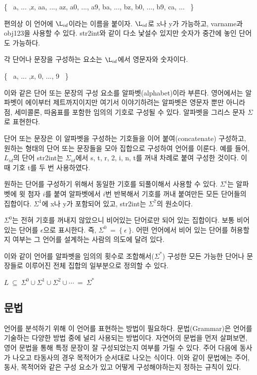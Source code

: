 \documentclass[a4paper]{book}
\begin{document}
\begin{center}
  \{ \ a, ... ,z, aa, ..., az, a0, ..., a9,
       ba, ..., bz, b0, ..., b9, ca, ...
     \ 
  \}
\end{center}

편의상 이 언어에 $\L_{id}$이라는 이름을 붙이자. $\L_{id}$로 x나 y가
가능하고, varname과 obj123을 사용할 수 있다. str2int와 같이 다소
낯설수 있지만 숫자가 중간에 놓인 단어도 가능하다.

각 단어나 문장을 구성하는 요소는 $\L_{id}$에서 영문자와 숫자이다.
\begin{center}
  \{ \ a, ... ,z, 0, ..., 9
     \ 
  \}
\end{center}


이와 같은 단어 또는 문장의 구성 요소를 알파벳(alphabet)이라
부른다. 영어에서는 알파벳이 에이부터 제트까지이지만 여기서
이야기하려는 알파벳은 영문자 뿐만 아니라 점, 세미콜론, 따옴표를 포함한
임의의 기호로 구성될 수 있다. 알파벳을 그리스 문자 $\Sigma$로
표현한다.

단어 또는 문장은 이 알파벳을 구성하는 기호들을 이어 붙여(concatenate)
구성하고, 원하는 형태의 단어 또는 문장들을 모아 집합으로 구성하여
언어를 이룬다. 예를 들어, $L_{id}$의 단어 str2int는 $\Sigma_{id}$에서
s, t, r, 2, i, n, t를 꺼내 차례로 붙여 구성한 것이다. 이때 기호 t를 두
번 사용하였다.

원하는 단어를 구성하기 위해서 동일한 기호를 되풀이해서 사용할 수
있다. $\Sigma^i$는 알파벳에 윗 첨자 $i$를 붙여 알파벳에서 $i$번
반복해서 기호를 꺼내 붙여만든 모든 단어들의 집합이다. $\Sigma^1$에
x나 y가 포함되어 있고, str2int는 $\Sigma^7$의 원소이다.

$\Sigma^0$는 전혀 기호를 꺼내지 않았으니 비어있는 단어로만 되어 있는
집합이다.  보통 비어있는 단어를 $\epsilon$으로 표시한다. 즉, $\Sigma^0
\ = \ \{ \ \epsilon \ \}$. 어떤 언어에서 비어 있는 단어를 허용할지
여부는 그 언어를 설계하는 사람의 의도에 달려 있다.

이와 같이 언어를 알파벳을 임의의 횟수로 조합해서($\Sigma^*$) 구성한
모든 가능한 단어나 문장들로 이루어진 전체 집합의 일부분으로 정의할 수
있다.

\begin{center}
  $L \ \subseteq \ \Sigma^0 \cup \Sigma^1 \cup \Sigma^2 \cup \cdots  \ = \ \Sigma^*$
\end{center}

\subsection{문법}

언어를 분석하기 위해 이 언어를 표현하는 방법이
필요하다. 문법(Grammar)은 언어를 기술하는 다양한 방법 중에 널리
사용되는 방법이다. 자연어의 문법을 먼저 살펴보면, 영어 문법을 통해
특정 문장이 잘 구성되었는지 여부를 가릴 수 있다. 주어 다음에 동사가
나오고 타동사의 경우 목적어가 순서대로 나오는 식이다. 이와 같이
문법에는 주어, 동사, 목적어와 같은 구성 요소가 있고 어떻게
구성해야하는지 정하는 규칙이 있다.
\end{document}
